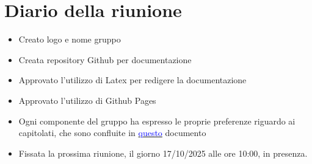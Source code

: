 \section{Diario della riunione}

\begin{itemize}
    \item Creato logo e nome gruppo
    \item Creata repository Github per documentazione
    \item Approvato l'utilizzo di Latex per redigere la documentazione
    \item Approvato l'utilizzo di Github Pages
    \item Ogni componente del gruppo ha espresso le proprie preferenze riguardo ai capitolati, che sono confluite in \href{https://docs.google.com/spreadsheets/d/1QaMKRtNCo9-x2O6sPm80BQgh0mwIuRUwIfmQZ6hzgeY/edit?gid=0#gid=0}{\textcolor{blue}{questo}} documento
    \item Fissata la prossima riunione, il giorno 17/10/2025 alle ore 10:00, in presenza.
\end{itemize}